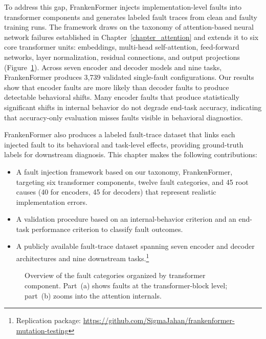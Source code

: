 To address this gap, FrankenFormer injects implementation-level faults into transformer components and generates labeled fault traces from clean and faulty training runs. The framework draws on the taxonomy of attention-based neural network failures established in Chapter~\ref{chapter_attention} and extends it to six core transformer units: embeddings, multi-head self-attention, feed-forward networks, layer normalization, residual connections, and output projections (Figure~\ref{fig:fault-taxonomy}).
Across seven encoder and decoder models and nine tasks, FrankenFormer produces 3{,}739 validated single-fault configurations.
Our results show that encoder faults are more likely than decoder faults to produce detectable behavioral shifts. Many encoder faults that produce statistically significant shifts in internal behavior do not degrade end-task accuracy, indicating that accuracy-only evaluation misses faults visible in behavioral diagnostics.

FrankenFormer also produces a labeled fault-trace dataset that links each injected fault to its behavioral and task-level effects, providing ground-truth labels for downstream diagnosis. This chapter makes the following contributions:
\begin{itemize}[leftmargin=*, nosep]
    \item A fault injection framework based on our taxonomy, FrankenFormer, targeting six transformer components, twelve fault categories, and 45 root causes (40 for encoders, 45 for decoders) that represent realistic implementation errors.

    \item A validation procedure based on an internal-behavior criterion and an end-task performance criterion to classify fault outcomes.

    \item A publicly available fault-trace dataset spanning seven encoder and decoder architectures and nine downstream tasks.\footnote{Replication package: \url{https://github.com/SigmaJahan/frankenformer-mutation-testing}}
\end{itemize}

\begin{figure}[!htbp]
    \centering
    \resizebox{0.88\textwidth}{!}{
        
    }
    \caption[Fault categories organized by transformer component.]{Overview of the fault categories organized by transformer component. Part~(a) shows faults at the transformer-block level; part~(b) zooms into the attention internals.}
    \label{fig:fault-taxonomy}
\end{figure}

